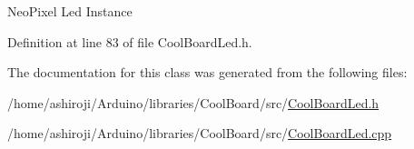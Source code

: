 Neo\+Pixel Led Instance 

Definition at line 83 of file Cool\+Board\+Led.\+h.



The documentation for this class was generated from the following files\+:\begin{DoxyCompactItemize}
\item 
/home/ashiroji/\+Arduino/libraries/\+Cool\+Board/src/\hyperlink{_cool_board_led_8h}{Cool\+Board\+Led.\+h}\item 
/home/ashiroji/\+Arduino/libraries/\+Cool\+Board/src/\hyperlink{_cool_board_led_8cpp}{Cool\+Board\+Led.\+cpp}\end{DoxyCompactItemize}
